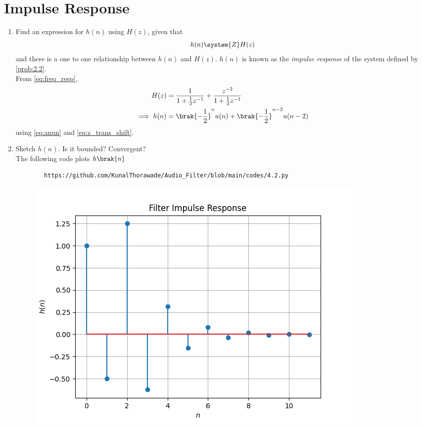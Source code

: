\documentclass[journal,12pt,twocolumn]{IEEEtran}
\theoremstyle{remark}
\begin{document}
\section{Impulse Response}
\begin{enumerate}[label=\thesection.\arabic*]
	\item \label{prob:impulse_resp}
		Find an expression for $h(n)$ using $H(z)$, given that 
		\begin{equation}
			\label{eq:impulse_resp}
			h(n) \system{Z} H(z)
		\end{equation}
		and there is a one to one relationship between $h(n)$ and $H(z)$. $h(n)$ is known as the {\em impulse response} of the
		system defined by \eqref{prob:2.2}.
		\\
		\solution From \eqref{eq:freq_resp},
		\begin{align}
			H(z) &= \frac{1}{1 + \frac{1}{2}z^{-1}} + \frac{ z^{-2}}{1 + \frac{1}{2}z^{-1}}
			\\
			\implies h(n) &= \brak{-\frac{1}{2}}^{n}u(n) + \brak{-\frac{1}{2}}^{n-2}u(n-2)
		\end{align}
		using \eqref{eq:anun} and \eqref{eq:z_trans_shift}.
	\item Sketch $h(n)$. Is it bounded? Convergent? 
		\\
		\solution The following code plots $h\brak{n}$ 
		\begin{lstlisting}
		https://github.com/KunalThorawade/Audio_Filter/blob/main/codes/4.2.py
		\end{lstlisting}
		\begin{figure}[H]
			\centering
			\includegraphics[width=\columnwidth]{figs/hn}

\end{figure}
\end{enumerate}
\end{document}
